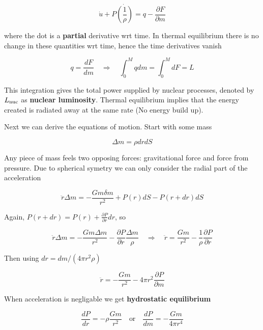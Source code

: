 \begin{equation*}
    \dot{u} + P \dot{ \left( \frac{1}{\rho} \right)} = q - \frac{\partial F}{\partial m}
\end{equation*}

where the dot is a \textbf{partial} derivative wrt time. In thermal equilibrium there is no change in these quantities wrt time, hence the time derivatives vanish

\begin{equation*}
    q = \frac{dF}{dm} \quad \Rightarrow \quad \int_0^M q dm = \int^M_0 dF = L
\end{equation*}

This integration gives the total power supplied by nuclear processes, denoted by $L_{\rm nuc}$ as \textbf{nuclear luminosity}. Thermal equilibrium implies that the energy created is radiated away at the same rate (No energy build up).

Next we can derive the equations of motion. Start with some mass

\begin{equation*}
    \Delta m = \rho dr dS
\end{equation*}

Any piece of mass feels two opposing forces: gravitational force and force from pressure. Due to spherical symetry we can only consider the radial part of the acceleration

\begin{equation*}
    \ddot{r} \Delta m = - \frac{G m \delta m}{r^2} + P(r) dS - P(r + dr) dS
\end{equation*}

Again, $P(r + dr) = P(r) + \frac{\partial P}{\partial r} dr$, so

\begin{equation*}
    \ddot{r} \Delta m = -\frac{G m \Delta m}{r^2} - \frac{\partial P}{\partial r} \frac{\Delta m}{\rho} \quad \Rightarrow \quad \ddot{r} = \frac{G m}{r^2} - \frac{1}{\rho} \frac{\partial P}{\partial r}
\end{equation*}

Then using $dr = dm/(4 \pi r^2 \rho)$

\begin{equation*}
    \ddot{r} = -\frac{G m}{r^2} - 4 \pi r^2 \frac{\partial P}{\partial m}
\end{equation*}

When acceleration is negligable we get \textbf{hydrostatic equilibrium}

\begin{equation*}
    \frac{dP}{dr} = -\rho \frac{G m}{r^2} \quad \text{or} \quad \frac{dP}{dm} = - \frac{Gm}{4 \pi r^4}
\end{equation*}

